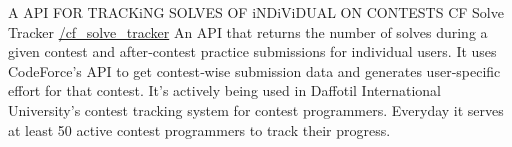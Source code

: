 \cventry
    {A API FOR TRACKiNG SOLVES OF iNDiViDUAL ON CONTESTS}
    {CF Solve Tracker}
    {\href{https://github.com/mehedi-shafi/cf_solve_tracker}{\faGithubSquare/cf_solve_tracker}}
    {}
    {
      An API that returns the number of solves during a given contest and after‑contest practice submissions for individual users. It uses CodeForce’s API to get contest‑wise submission data and generates user‑specific effort for that contest. It’s actively being used in Daffotil International University’s contest tracking system for contest programmers. Everyday it serves at least 50 active contest programmers to track their progress.
    }